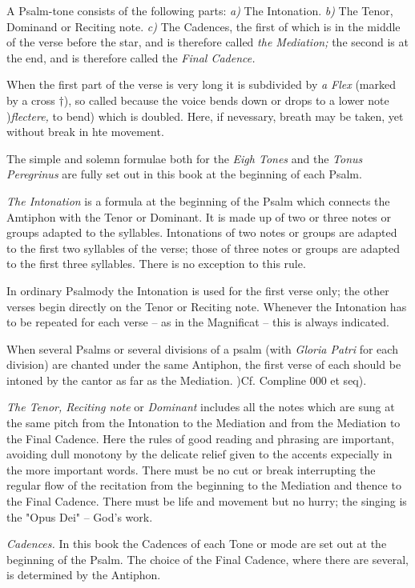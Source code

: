 A Psalm-tone consists of the following parts: {\it a)} The Intonation. {\it b)} The Tenor, Dominand or Reciting note. {\it c)} The Cadences, the first of which is in the middle of the verse before the star, and is therefore called {\it the Mediation;} the second is at the end, and is therefore called the {\it Final Cadence.}

When the first part of the verse is very long it is subdivided by {\it a Flex} (marked by a cross $\dag$), so called because the voice bends down or drops to a lower note ){\it flectere,} to bend) which is doubled. Here, if nevessary, breath may be taken, yet without break in hte movement.

The simple and solemn formulae both for the {\it Eigh Tones} and the {\it Tonus Peregrinus} are fully set out in this book at the beginning of each Psalm.

{\it The Intonation} is a formula at the beginning of the Psalm which connects the Amtiphon with the Tenor or Dominant. It is made up of two or three notes or groups adapted to the syllables. Intonations of two notes or groups are adapted to the first two syllables of the verse; those of three notes or groups are adapted to the first three syllables. There is no exception to this rule.

In ordinary Psalmody the Intonation is used for the first verse only; the other verses begin directly on the Tenor or Reciting note. Whenever the Intonation has to be repeated for each verse -- as in the Magnificat -- this is always indicated.

When several Psalms or several divisions of a psalm (with {\it Gloria Patri} for each division) are chanted under the same Antiphon, the first verse of each should be intoned by the cantor as far as the Mediation. )Cf. Compline 000 et seq).

{\it The Tenor, Reciting note} or {\it Dominant} includes all the notes which are sung at the same pitch from the Intonation to the Mediation and from the Mediation to the Final Cadence. Here the rules of good reading and phrasing are important, avoiding dull monotony by the delicate relief given to the accents expecially in the more important words. There must be no cut or break interrupting the regular flow of the recitation from the beginning to the Mediation and thence to the Final Cadence. There must be life and movement but no hurry; the singing is the "Opus Dei" -- God's work.

{\it Cadences.} In this book the Cadences of each Tone or mode are set out at the beginning of the Psalm. The choice of the Final Cadence, where there are several, is determined by the Antiphon.


